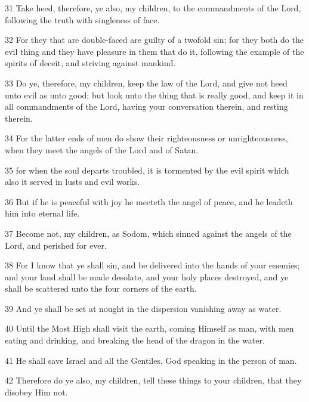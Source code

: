 \par 31 Take heed, therefore, ye also, my children, to the commandments of the Lord, following the truth with singleness of face.

\par 32 For they that are double-faced are guilty of a twofold sin; for they both do the evil thing and they have pleasure in them that do it, following the example of the spirits of deceit, and striving against mankind.

\par 33 Do ye, therefore, my children, keep the law of the Lord, and give not heed unto evil as unto good; but look unto the thing that is really good, and keep it in all commandments of the Lord, having your conversation therein, and resting therein.

\par 34 For the latter ends of men do show their righteousness or unrighteousness, when they meet the angels of the Lord and of Satan.

\par 35 for when the soul departs troubled, it is tormented by the evil spirit which also it served in lusts and evil works.

\par 36 But if he is peaceful with joy he meeteth the angel of peace, and he leadeth him into eternal life.

\par 37 Become not, my children, as Sodom, which sinned against the angels of the Lord, and perished for ever.

\par 38 For I know that ye shall sin, and be delivered into the hands of your enemies; and your land shall be made desolate, and your holy places destroyed, and ye shall be scattered unto the four corners of the earth.

\par 39 And ye shall be set at nought in the dispersion vanishing away as water.

\par 40 Until the Most High shall visit the earth, coming Himself as man, with men eating and drinking, and breaking the head of the dragon in the water.

\par 41 He shall save Israel and all the Gentiles, God speaking in the person of man.

\par 42 Therefore do ye also, my children, tell these things to your children, that they disobey Him not.

